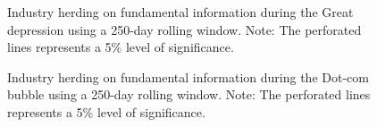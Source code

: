 \documentclass[
  letterpaper,
  DIV=11,
  numbers=noendperiod]{scrartcl}
\begin{document}
\begin{figure}[H]


\caption{\label{fig-rol_fundamental_gd}Industry herding on fundamental
information during the Great depression using a 250-day rolling window.
Note: The perforated lines represents a 5\% level of significance.}

\end{figure}%

\begin{figure}[H]


\caption{\label{fig-rol_fundamental_db}Industry herding on fundamental
information during the Dot-com bubble using a 250-day rolling window.
Note: The perforated lines represents a 5\% level of significance.}

\end{figure}%
\end{document}
